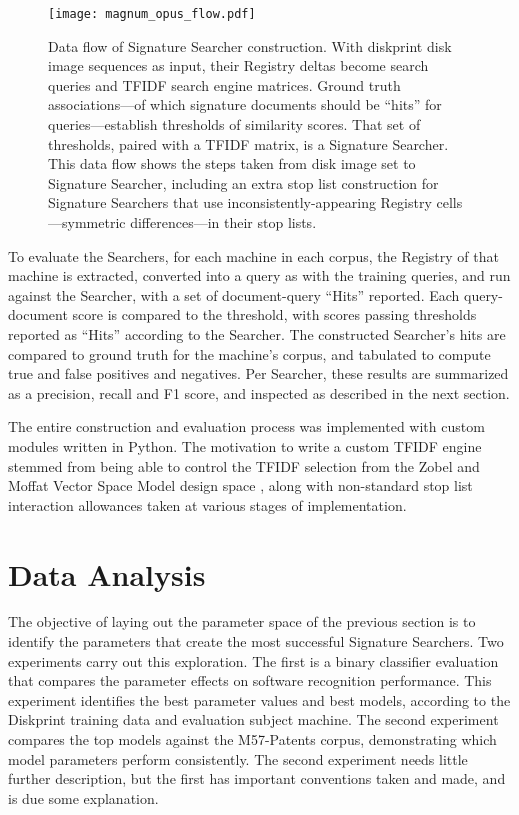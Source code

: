 \documentclass[11pt]{ucthesis}
\theoremstyle{plain}
\theoremstyle{definition}
\begin{document}
\begin{figure}
\begin{center}
\texttt{[image: magnum\_opus\_flow.pdf]}
\caption{\label{fig:magnumopusflow}Data flow of Signature Searcher construction.  With diskprint disk image sequences as input, their Registry deltas become search queries and TFIDF search engine matrices.  Ground truth associations---of which signature documents should be ``hits'' for queries---establish thresholds of similarity scores.  That set of thresholds, paired with a TFIDF matrix, is a Signature Searcher.  This data flow shows the steps taken from disk image set to Signature Searcher, including an extra stop list construction for Signature Searchers that use inconsistently-appearing Registry cells---symmetric differences---in their stop lists.}
\end{center}
\end{figure}

To evaluate the Searchers, for each machine in each corpus, the Registry of that machine is extracted, converted into a query as with the training queries, and run against the Searcher, with a set of document-query ``Hits'' reported.  Each query-document score is compared to the threshold, with scores passing thresholds reported as ``Hits'' according to the Searcher.  The constructed Searcher's hits are compared to ground truth for the machine's corpus, and tabulated to compute true and false positives and negatives.  Per Searcher, these results are summarized as a precision, recall and F1 score, and inspected as described in the next section.

The entire construction and evaluation process was implemented with custom modules written in Python.  The motivation to write a custom TFIDF engine stemmed from being able to control the TFIDF selection from the Zobel and Moffat Vector Space Model design space \cite{zobel:sigir98}, along with non-standard stop list interaction allowances taken at various stages of implementation.


\section{Data Analysis}

The objective of laying out the parameter space of the previous section is to identify the parameters that create the most successful Signature Searchers.  Two experiments carry out this exploration.  The first is a binary classifier evaluation that compares the parameter effects on software recognition performance.  This experiment identifies the best parameter values and best models, according to the Diskprint training data and evaluation subject machine.  The second experiment compares the top models against the M57-Patents corpus, demonstrating which model parameters perform consistently.  The second experiment needs little further description, but the first has important conventions taken and made, and is due some explanation.
\end{document}
